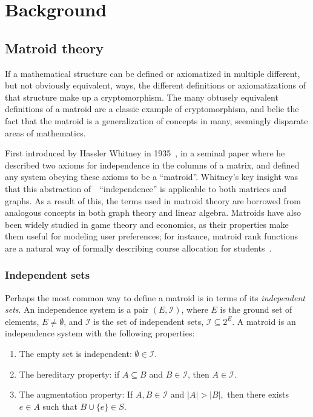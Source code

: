 \chapter{Background}

\section{Matroid theory}
\label{sec:matroid-theory}
If a mathematical structure can be defined or axiomatized in multiple different, but not obviously equivalent, ways, the different definitions or axiomatizations of that structure make up a cryptomorphism. The many obtusely equivalent definitions of a matroid are a classic example of cryptomorphism, and belie the fact that the matroid is a generalization of concepts in many, seemingly disparate areas of mathematics.

First introduced by Hassler Whitney in 1935~\cite{whitney-1935}, in a seminal paper where he described two axioms for independence in the columns of a matrix, and defined any system obeying these axioms to be a ``matroid''. Whitney's key insight was that this abstraction of~~``independence'' is applicable to both matrices and graphs. As a result of this, the terms used in matroid theory are borrowed from analogous concepts in both graph theory and linear algebra. Matroids have also been widely studied in game theory and economics, as their properties make them useful for modeling user preferences; for instance, matroid rank functions are a natural way of formally describing course allocation for students~\cite{benabbou-2021}. 

\subsection*{Independent sets}
Perhaps the most common way to define a matroid is in terms of its \textit{independent sets}. An independence system is a pair $(E, \mathcal{I})$, where $E$ is the ground set of elements, $E \not= \emptyset$, and $\mathcal{I}$ is the set of independent sets, $\mathcal{I} \subseteq 2^E$. A matroid is an independence system with the following properties:

\begin{enumerate}
  \item The empty set is independent: $\emptyset \in \mathcal{I}$.
  \item The hereditary property: if $A \subseteq B$ and $B \in \mathcal{I}$, then $A \in \mathcal{I}$.
  \item The augmentation property: If $A, B \in \mathcal{I}$ and $|A| > |B|,$ then there exists $e \in A$ such that $B \cup \{e\} \in S$.
\end{enumerate}

